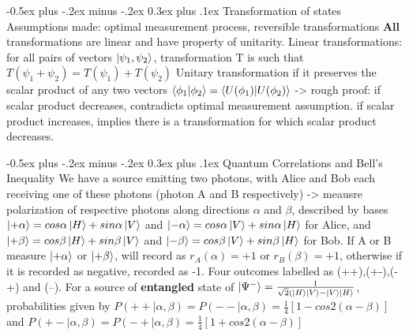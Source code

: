 \documentclass[a4paper,11pt,portrait]{article}
\makeatletter
\renewcommand{\subsection}{\@startsection{subsection}{2}{0mm}%
                                {-0.5ex plus -.2ex minus -.2ex}%
                                {0.3ex plus .1ex}%
                                {\normalfont\footnotesize\bfseries}}
\makeatother
\begin{document}
\begin{multicols}{3}
\subsection{Transformation of states}
Assumptions made: optimal measurement process, reversible transformations
\textbf{All} transformations are linear and have property of unitarity.
Linear transformations:
for all pairs of vectors ${\ket{\psi_1,\psi_2}}$, transformation T is such that $T(\psi_1 + \psi_2) = T(\psi_1) + T(\psi_2)$
Unitary transformation if it preserves the scalar product of any two vectors 
$\braket{\phi_1|\phi_2} = \braket{U(\phi_1) | U(\phi_2)}$ -> rough proof: if scalar product decreases, contradicts optimal measurement assumption. if scalar product increases, implies there is a transformation for which scalar product decreases.


\subsection{Quantum Correlations and Bell's Inequality} We have a source emitting two photons, with Alice and Bob each receiving one of these photons (photon A and B respectively) -> meausre polarization of respective photons along directions $\alpha$ and $\beta$, described by bases $\ket{+ \alpha} = cos \alpha \ket{H} + sin \alpha \ket{V} $ and $\ket{- \alpha} = cos \alpha \ket{V} + sin \alpha \ket{H} $ for Alice, and $\ket{+ \beta} = cos \beta \ket{H} + sin \beta \ket{V} $ and $\ket{- \beta} = cos \beta \ket{V} + sin \beta \ket{H} $ for Bob. If A or B measure $\ket{+\alpha}$ or $\ket{+\beta}$, will record as $r_A(\alpha)= +1$ or $r_B(\beta) = +1$, otherwise if it is recorded as negative, recorded as -1. Four outcomes labelled as (++),(+-),(-+) and (--).
For a source of \textbf{entangled} state of $\ket{\Psi^-} = \frac{1}{\sqrt{2}(\ket{H}\ket{V} - \ket{V}\ket{H}}$, probabilities given by 
$P(++ | \alpha, \beta) = P(--| \alpha, \beta) = \frac{1}{4}[1 - cos2(\alpha - \beta)]$ and $P(+- | \alpha, \beta) = P(-+| \alpha, \beta) = \frac{1}{4}[1 + cos2(\alpha - \beta)]$

\end{multicols}
\end{document}
